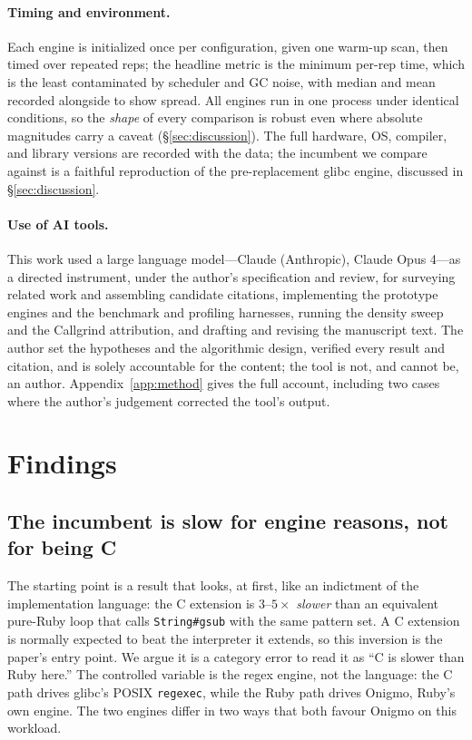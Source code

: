 \documentclass[acmsmall,nonacm,screen]{acmart}
\begin{document}
\paragraph{Timing and environment.} Each engine is initialized once per
configuration, given one warm-up scan, then timed over repeated reps; the headline
metric is the minimum per-rep time, which is the least contaminated by scheduler and
GC noise, with median and mean recorded alongside to show spread. All engines run
in one process under identical conditions, so the \emph{shape} of every comparison
is robust even where absolute magnitudes carry a caveat (\S\ref{sec:discussion}).
The full hardware, OS, compiler, and library versions are recorded with the data;
the incumbent we compare against is a faithful reproduction of the pre-replacement
glibc engine, discussed in \S\ref{sec:discussion}.

\paragraph{Use of AI tools.} This work used a large language model---Claude
(Anthropic), Claude Opus 4---as a directed instrument, under the author's
specification and review, for surveying related work and assembling candidate
citations, implementing the prototype engines and the benchmark and profiling
harnesses, running the density sweep and the Callgrind attribution, and drafting and
revising the manuscript text. The author set the hypotheses and the algorithmic
design, verified every result and citation, and is solely accountable for the
content; the tool is not, and cannot be, an author. Appendix~\ref{app:method} gives
the full account, including two cases where the author's judgement corrected the
tool's output.

\section{Findings}
\label{sec:findings}

\subsection{The incumbent is slow for engine reasons, not for being C}
\label{sec:finding-alloc}
The starting point is a result that looks, at first, like an indictment of the
implementation language: the C extension is \(3\)--\(5\times\) \emph{slower} than
an equivalent pure-Ruby loop that calls \texttt{String\#gsub} with the same
pattern set. A C extension is normally expected to beat the interpreter it
extends, so this inversion is the paper's entry point. We argue it is a category
error to read it as ``C is slower than Ruby here.'' The controlled variable is the
regex engine, not the language: the C path drives glibc's POSIX
\texttt{regexec}, while the Ruby path drives Onigmo, Ruby's own engine. The two
engines differ in two ways that both favour Onigmo on this workload.
\end{document}
